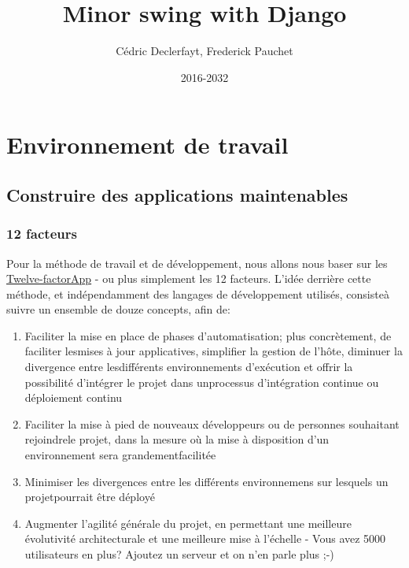 \documentclass[a4paper,12pt]{book}
\begin{document}
\author{Cédric Declerfayt, Frederick Pauchet}
\title{Minor swing with Django}
\date{2016-2032}

\frontmatter
\maketitle
\tableofcontents

\mainmatter
\part{Environnement de travail}

\chapter{Construire des applications maintenables}
\section{12 facteurs}

Pour la méthode de travail et de développement, nous allons nous baser sur les \href{https://12factor.net/fr/}{Twelve-factorApp} - ou plus simplement les 12 facteurs. 
L’idée derrière cette méthode, et indépendamment des langages de développement utilisés, consisteà suivre un ensemble de douze concepts, afin de:

\begin{enumerate}
	\item Faciliter  la  mise  en  place  de  phases  d’automatisation;  plus  concrètement,  de  faciliter  lesmises  à  jour  applicatives,  simplifier  la  gestion  de  l’hôte,  diminuer  la  divergence  entre  lesdifférents  environnements  d’exécution  et  offrir  la  possibilité  d’intégrer  le  projet  dans  unprocessus d’intégration continue ou déploiement continu
	\item Faciliter  la  mise  à  pied  de  nouveaux  développeurs  ou  de  personnes  souhaitant  rejoindrele  projet,  dans  la  mesure  où  la  mise  à  disposition  d’un  environnement  sera  grandementfacilitée
	\item Minimiser  les  divergences  entre  les  différents  environnemens  sur  lesquels  un  projetpourrait être déployé
	\item Augmenter    l’agilité    générale    du    projet,    en    permettant    une    meilleure    évolutivité architecturale et une meilleure mise à l’échelle - Vous avez 5000 utilisateurs en plus? Ajoutez un serveur et on n’en parle plus ;-)
\end{enumerate}
\end{document}
